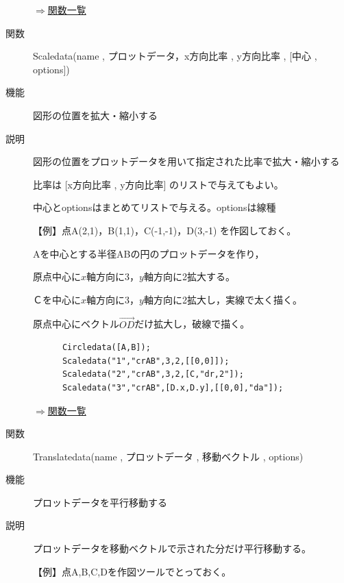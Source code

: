 \documentclass[papersize,a4paper,12pt,uplatex]{jsarticle}
\begin{document}
\begin{description}
\begin{flushright}  \hyperlink{functionlist}{$\Rightarrow$関数一覧}\end{flushright}

\vspace{\baselineskip}
\hypertarget{scaledata}{}
\item[関数]  Scaledata(name , プロットデータ，x方向比率 , y方向比率 , [中心 , options])
\item[機能]  図形の位置を拡大・縮小する
\item[説明]  図形の位置をプロットデータを用いて指定された比率で拡大・縮小する

  比率は [x方向比率 , y方向比率] のリストで与えてもよい。
  
  中心とoptionsはまとめてリストで与える。optionsは線種
  
\vspace{\baselineskip}
【例】点A(2,1)，B(1,1)，C(-1,-1)，D(3,-1) を作図しておく。

 Aを中心とする半径ABの円のプロットデータを作り，
    
原点中心に$x$軸方向に3，$y$軸方向に2拡大する。

Ｃを中心に$x$軸方向に3，$y$軸方向に2拡大し，実線で太く描く。

原点中心にベクトル$\overrightarrow{OD} $だけ拡大し，破線で描く。
\begin{verbatim}
      Circledata([A,B]);
      Scaledata("1","crAB",3,2,[[0,0]]);
      Scaledata("2","crAB",3,2,[C,"dr,2"]);
      Scaledata("3","crAB",[D.x,D.y],[[0,0],"da"]);
\end{verbatim}
 \begin{center}  \end{center}

\begin{flushright}  \hyperlink{functionlist}{$\Rightarrow$関数一覧}\end{flushright}


\vspace{\baselineskip}
\hypertarget{translatedata}{}
\item[関数]  Translatedata(name , プロットデータ , 移動ベクトル , options)
\item[機能]  プロットデータを平行移動する
\item[説明]  プロットデータを移動ベクトルで示された分だけ平行移動する。

\vspace{\baselineskip}
【例】点A,B,C,Dを作図ツールでとっておく。


\end{description}
\end{document}
